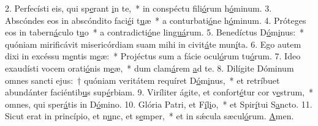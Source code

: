 2. Perfecísti eis, qui sp\uline{e}rant \uline{i}n te,~* in conspéctu fili\uline{ó}rum h\uline{ó}minum.
3. Abscóndes eos in abscóndito faci\uline{é}i t\uline{u}æ~* a conturbati\uline{ó}ne h\uline{ó}minum.
4. Próteges eos in tabern\uline{á}culo t\uline{u}o~* a contradicti\uline{ó}ne lin\uline{guá}rum.
5. Benedíctus D\uline{ó}m\uline{i}nus:~* quóniam mirificávit misericórdiam suam mihi in civit\uline{á}te mun\uline{í}ta.
6. Ego autem dixi in excéssu m\uline{e}ntis m\uline{e}æ:~* Projéctus sum a fácie ocul\uline{ó}rum tu\uline{ó}rum.
7. Ideo exaudísti vocem orati\uline{ó}nis m\uline{e}æ,~* dum clam\uline{á}rem \uline{a}d te.
8. Dilígite Dóminum omnes sancti ejus:~† quóniam veritátem requíret D\uline{ó}m\uline{i}nus,~* et retríbuet abundánter faciéntib\uline{u}s sup\uline{é}rbiam.
9. Viríliter ágite, et confort\uline{é}tur cor v\uline{e}strum,~* omnes, qui sper\uline{á}tis in D\uline{ó}mino.
10. Glória Patri, et F\uline{í}l\uline{i}o,~* et Spir\uline{í}tui S\uline{a}ncto.
11. Sicut erat in princípio, et n\uline{u}nc, et s\uline{e}mper,~* et in sǽcula sæcul\uline{ó}rum. \uline{A}men.
